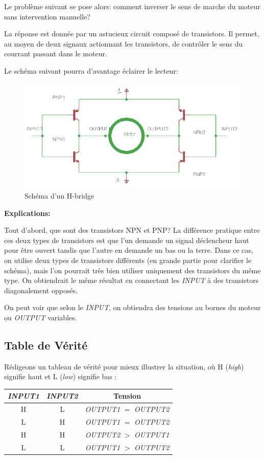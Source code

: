 \documentclass[a4paper,12pt]{article}
\begin{document}
{Le probl\`eme suivant se pose alors: comment inverser le sens de marche du
moteur sans intervention manuelle?

La r\'eponse est donn\'ee par un astucieux circuit compos\'e de
transistors. Il permet, au moyen de deux signaux actionnant les transistors,
de contr\^oler le sens du courrant passant dans le moteur.

Le sch\'ema suivant pourra d'avantage \'eclairer le lecteur:

\begin{figure}[h]
\centering
\includegraphics[width=1.0\textwidth]{figures/H-bridge}
    \caption{\label{H-bridge}Sch\'ema d'un H-bridge}
\end{figure}

\textbf{Explications:}

Tout d'abord, que sont des transistors NPN et PNP? La diff\'erence pratique
entre ces deux types de transistors est que l'un demande un signal
d\'eclencheur haut pour \^etre ouvert tandis que l'autre en demande un
bas ou la terre. Dans ce cas, on utilise deux types de transistors
diff\'erents (en grande partie pour clarifier le sch\'ema), mais l'on pourrait
tr\`es bien utiliser uniquement des transistors du m\^eme type. On obtiendrait
le m\^eme r\'esultat en connectant les \emph{INPUT} \`a des transistors
diagonalement oppos\'es\cite{RobotRoom}.


On peut voir que selon le \emph{INPUT}, on obtiendra des tensions au bornes du
moteur ou \emph{OUTPUT} variables.
\subsection{Table de V\'erit\'e}
R\'edigeons un tableau de v\'erit\'e pour mieux illustrer la situation, o\`u H
(\textit{high}) signifie haut et L (\textit{low}) signifie bas :

\begin{table}[h]
\begin{center}
  \begin{tabular}{c|c||c}  
    \emph{INPUT1} & \emph{INPUT2}
    & Tension\\
    \hline
    H & L & \emph{OUTPUT1} $=$ \emph{OUTPUT2}\\
    L & H & \emph{OUTPUT1} $=$ \emph{OUTPUT2}\\
    H & H & \emph{OUTPUT2} $>$ \emph{OUTPUT1}\\
    L & L & \emph{OUTPUT1} $>$ \emph{OUTPUT2}\\
  \end{tabular}
\end{center}


\end{table}}
\end{document}
